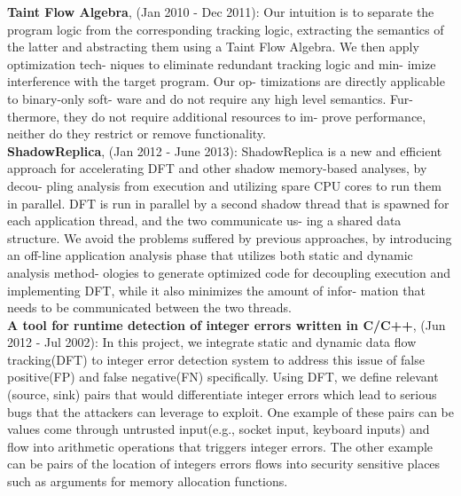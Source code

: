 \documentclass[10pt,a4]{article}
\begin{document}
\begin{small}
\begin{itemize}
  {\bf Taint Flow Algebra}, (Jan 2010 - Dec 2011): Our intuition is to separate
  the program logic from the corresponding tracking logic, extracting the
  semantics of the latter and abstracting them using a Taint Flow Algebra. We
  then apply optimization tech- niques to eliminate redundant tracking logic and
  min- imize interference with the target program. Our op- timizations are
  directly applicable to binary-only soft- ware and do not require any high
  level semantics. Fur- thermore, they do not require additional resources to
  im- prove performance, neither do they restrict or remove functionality.\\

  {\bf ShadowReplica}, (Jan 2012 - June 2013): ShadowReplica is a new and
  efficient approach for accelerating DFT and other shadow memory-based
  analyses, by decou- pling analysis from execution and utilizing spare CPU
  cores to run them in parallel. DFT is run in parallel by a second shadow
  thread that is spawned for each application thread, and the two communicate
  us- ing a shared data structure. We avoid the problems suffered by previous
  approaches, by introducing an off-line application analysis phase that
  utilizes both static and dynamic analysis method- ologies to generate
  optimized code for decoupling execution and implementing DFT, while it also
  minimizes the amount of infor- mation that needs to be communicated between
  the two threads.\\
%

  {\bf A tool for runtime detection of integer errors written in C/C++}, (Jun
  2012 - Jul 2002): In this project, we integrate static and dynamic data flow
  tracking(DFT) to integer error detection system to address this issue of false
  positive(FP) and false negative(FN) specifically. Using DFT, we define
  relevant (source, sink) pairs that would differentiate integer errors which
  lead to serious bugs that the attackers can leverage to exploit. One example
  of these pairs can be values come through untrusted input(e.g., socket input,
  keyboard inputs) and flow into arithmetic operations that triggers integer
  errors. The other example can be pairs of the location of integers errors
  flows into security sensitive places such as arguments for memory allocation
  functions. \\
\end{itemize}



\end{small}
\end{document}
